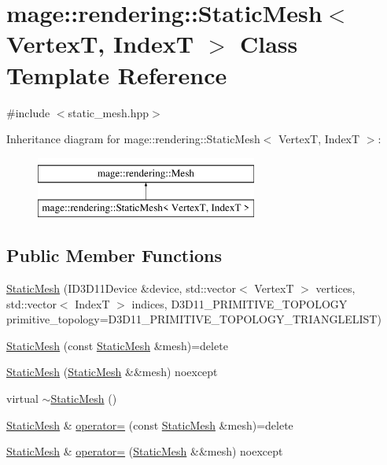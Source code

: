 \hypertarget{classmage_1_1rendering_1_1_static_mesh}{}\section{mage\+:\+:rendering\+:\+:Static\+Mesh$<$ VertexT, IndexT $>$ Class Template Reference}
\label{classmage_1_1rendering_1_1_static_mesh}


{\ttfamily \#include $<$static\+\_\+mesh.\+hpp$>$}

Inheritance diagram for mage\+:\+:rendering\+:\+:Static\+Mesh$<$ VertexT, IndexT $>$\+:\begin{figure}[H]
\begin{center}
\leavevmode
\includegraphics[height=2.000000cm]{classmage_1_1rendering_1_1_static_mesh}
\end{center}
\end{figure}
\subsection*{Public Member Functions}
\begin{DoxyCompactItemize}
\item 
\hyperlink{classmage_1_1rendering_1_1_static_mesh_a99a189dbe9ff6f095063967f68c7285d}{Static\+Mesh} (I\+D3\+D11\+Device \&device, std\+::vector$<$ VertexT $>$ vertices, std\+::vector$<$ IndexT $>$ indices, D3\+D11\+\_\+\+P\+R\+I\+M\+I\+T\+I\+V\+E\+\_\+\+T\+O\+P\+O\+L\+O\+GY primitive\+\_\+topology=D3\+D11\+\_\+\+P\+R\+I\+M\+I\+T\+I\+V\+E\+\_\+\+T\+O\+P\+O\+L\+O\+G\+Y\+\_\+\+T\+R\+I\+A\+N\+G\+L\+E\+L\+I\+ST)
\item 
\hyperlink{classmage_1_1rendering_1_1_static_mesh_a0e824924504f75bbfa578caf0637dd2a}{Static\+Mesh} (const \hyperlink{classmage_1_1rendering_1_1_static_mesh}{Static\+Mesh} \&mesh)=delete
\item 
\hyperlink{classmage_1_1rendering_1_1_static_mesh_a7cf948089fc5ceae5284bab45f216a75}{Static\+Mesh} (\hyperlink{classmage_1_1rendering_1_1_static_mesh}{Static\+Mesh} \&\&mesh) noexcept
\item 
virtual \hyperlink{classmage_1_1rendering_1_1_static_mesh_a44fd6319f4a56ff20bc81fb9968dac05}{$\sim$\+Static\+Mesh} ()
\item 
\hyperlink{classmage_1_1rendering_1_1_static_mesh}{Static\+Mesh} \& \hyperlink{classmage_1_1rendering_1_1_static_mesh_a62f007ca9d1dc316519468fb7b74af19}{operator=} (const \hyperlink{classmage_1_1rendering_1_1_static_mesh}{Static\+Mesh} \&mesh)=delete
\item 
\hyperlink{classmage_1_1rendering_1_1_static_mesh}{Static\+Mesh} \& \hyperlink{classmage_1_1rendering_1_1_static_mesh_ab4b3e0d32af550bf440cc2aaf731a350}{operator=} (\hyperlink{classmage_1_1rendering_1_1_static_mesh}{Static\+Mesh} \&\&mesh) noexcept
\end{DoxyCompactItemize}
